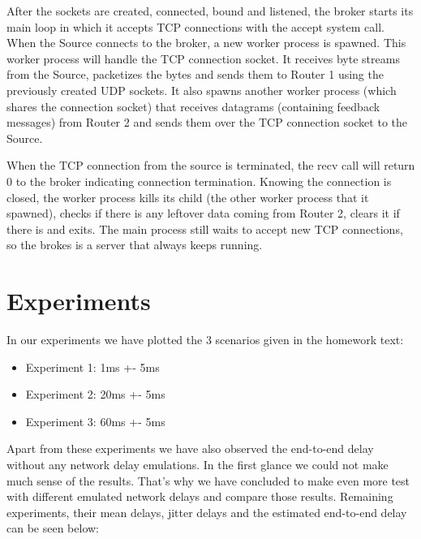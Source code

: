 \documentclass[conference]{IEEEtran}
\begin{document}
After the sockets are created, connected, bound and listened, the broker starts
its main loop in which it accepts TCP connections with the accept system call.
When the Source connects to the broker, a new worker process is spawned. This worker
process will handle the TCP connection socket. It receives byte streams from the Source,
packetizes the bytes and sends them to Router 1 using the previously
created UDP sockets. It also spawns another worker process (which shares the connection
socket) that receives datagrams (containing feedback messages) from Router 2 and
sends them over the TCP connection socket to the Source.

When the TCP connection from the source is terminated, the recv call will return 0
to the broker indicating connection termination. Knowing the connection is closed,
the worker process kills its child (the other worker process that it spawned),
checks if there is any leftover data coming from Router 2, clears it if there is
and exits. The main process still waits to accept new TCP connections, so the brokes
is a server that always keeps running.

\section{Experiments}

In our experiments we have plotted the 3 scenarios given in the homework text:

\begin{itemize}
\item Experiment 1: 1ms +- 5ms
\item Experiment 2: 20ms +- 5ms
\item Experiment 3: 60ms +- 5ms
\end{itemize}
Apart from these experiments we have also observed the end-to-end delay without any network delay emulations. In the first glance we could not make much sense of the results. That's why we have concluded to  make even more test with different emulated network delays and compare those results. Remaining experiments, their mean delays, jitter delays and the estimated end-to-end delay can be seen below:
\end{document}
